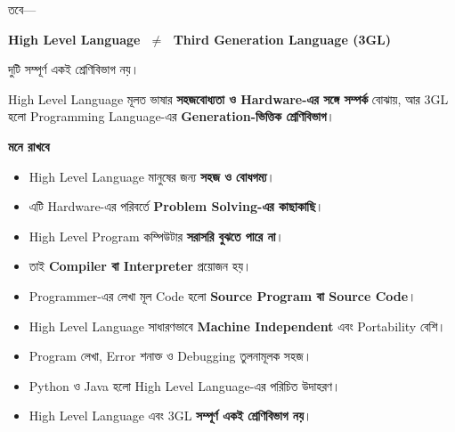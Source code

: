 তবে—

\begin{center}

\textbf{
High Level Language
\(\;\neq\;\)
Third Generation Language (3GL)
}

\end{center}

দুটি সম্পূর্ণ একই শ্রেণিবিভাগ নয়।

High Level Language মূলত ভাষার \textbf{সহজবোধ্যতা ও Hardware-এর
সঙ্গে সম্পর্ক} বোঝায়, আর 3GL হলো Programming Language-এর
\textbf{Generation-ভিত্তিক শ্রেণিবিভাগ}।

\begin{rememberbox}

\textbf{\color{deepOrange}মনে রাখবে}

\begin{itemize}

\item High Level Language মানুষের জন্য
\textbf{সহজ ও বোধগম্য}।

\item এটি Hardware-এর পরিবর্তে
\textbf{Problem Solving-এর কাছাকাছি}।

\item High Level Program কম্পিউটার
\textbf{সরাসরি বুঝতে পারে না}।

\item তাই \textbf{Compiler বা Interpreter} প্রয়োজন হয়।

\item Programmer-এর লেখা মূল Code হলো
\textbf{Source Program বা Source Code}।

\item High Level Language সাধারণভাবে
\textbf{Machine Independent} এবং Portability বেশি।

\item Program লেখা, Error শনাক্ত ও Debugging তুলনামূলক সহজ।

\item Python ও Java হলো High Level Language-এর পরিচিত উদাহরণ।

\item High Level Language এবং 3GL
\textbf{সম্পূর্ণ একই শ্রেণিবিভাগ নয়}।

\end{itemize}

\end{rememberbox}

\small

